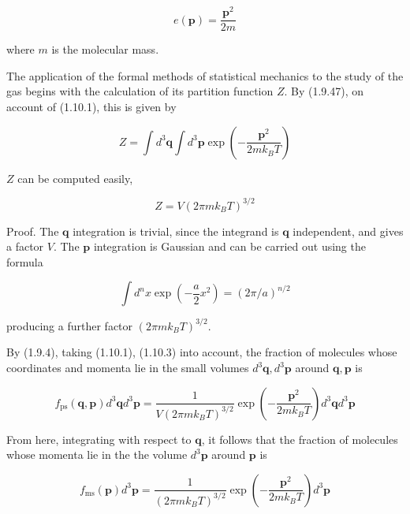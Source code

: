 \documentclass{article}
\begin{document}
\begin{equation*}
e(\boldsymbol{p})=\frac{\boldsymbol{p}^{2}}{2 m} \tag{1.10.1}
\end{equation*}

where $m$ is the molecular mass.

The application of the formal methods of statistical mechanics to the study of the gas begins with the calculation of its partition function $Z$. By (1.9.47), on account of (1.10.1), this is given by

\begin{equation*}
Z=\int d^{3} \boldsymbol{q} \int d^{3} \boldsymbol{p} \exp \left(-\frac{\boldsymbol{p}^{2}}{2 m k_{B} T}\right) \tag{1.10.2}
\end{equation*}

$Z$ can be computed easily,

\begin{equation*}
Z=V\left(2 \pi m k_{B} T\right)^{3 / 2} \tag{1.10.3}
\end{equation*}


Proof. The $\boldsymbol{q}$ integration is trivial, since the integrand is $\boldsymbol{q}$ independent, and gives a factor $V$. The $\boldsymbol{p}$ integration is Gaussian and can be carried out using the formula
 
\begin{equation*}
\int d^{n} x \exp \left(-\frac{a}{2} x^{2}\right)=(2 \pi / a)^{n / 2} \tag{1.10.4}
\end{equation*}
 
producing a further factor $\left(2 \pi m k_{B} T\right)^{3 / 2}$.

By (1.9.4), taking (1.10.1), (1.10.3) into account, the fraction of molecules whose coordinates and momenta lie in the small volumes $d^{3} \boldsymbol{q}, d^{3} \boldsymbol{p}$ around $\boldsymbol{q}, \boldsymbol{p}$ is
 
\begin{equation*}
f_{\mathrm{ps}}(\boldsymbol{q}, \boldsymbol{p}) d^{3} \boldsymbol{q} d^{3} \boldsymbol{p}=\frac{1}{V\left(2 \pi m k_{B} T\right)^{3 / 2}} \exp \left(-\frac{\boldsymbol{p}^{2}}{2 m k_{B} T}\right) d^{3} \boldsymbol{q} d^{3} \boldsymbol{p} \tag{1.10.5}
\end{equation*}
 

From here, integrating with respect to $\boldsymbol{q}$, it follows that the fraction of molecules whose momenta lie in the the volume $d^{3} \boldsymbol{p}$ around $\boldsymbol{p}$ is
 
\begin{equation*}
f_{\mathrm{ms}}(\boldsymbol{p}) d^{3} \boldsymbol{p}=\frac{1}{\left(2 \pi m k_{B} T\right)^{3 / 2}} \exp \left(-\frac{\boldsymbol{p}^{2}}{2 m k_{B} T}\right) d^{3} \boldsymbol{p} \tag{1.10.6}
\end{equation*}
 
\end{document}
